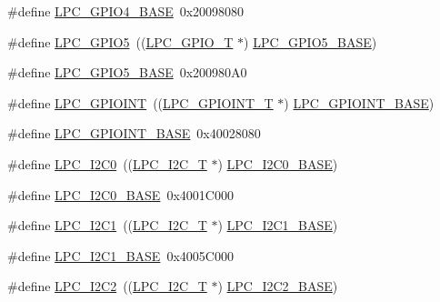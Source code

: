 \begin{DoxyCompactItemize}
\#define \hyperlink{group__PERIPH__177X__8X__BASE_gaa54352e7745932e78b56bcbc1d70fa21}{L\+P\+C\+\_\+\+G\+P\+I\+O4\+\_\+\+B\+A\+SE}~0x20098080
\item 
\#define \hyperlink{group__PERIPH__177X__8X__BASE_gad41551ad62a13c91b7fff17e4340cb69}{L\+P\+C\+\_\+\+G\+P\+I\+O5}~((\hyperlink{structLPC__GPIO__T}{L\+P\+C\+\_\+\+G\+P\+I\+O\+\_\+T}             $\ast$) \hyperlink{group__PERIPH__407X__8X__BASE_gaf6bbc732156be98ff8a4d15fa7558ad6}{L\+P\+C\+\_\+\+G\+P\+I\+O5\+\_\+\+B\+A\+SE})
\item 
\#define \hyperlink{group__PERIPH__177X__8X__BASE_gaf6bbc732156be98ff8a4d15fa7558ad6}{L\+P\+C\+\_\+\+G\+P\+I\+O5\+\_\+\+B\+A\+SE}~0x200980\+A0
\item 
\#define \hyperlink{group__PERIPH__177X__8X__BASE_gaefe2f52407c1ce58395766dc760525b5}{L\+P\+C\+\_\+\+G\+P\+I\+O\+I\+NT}~((\hyperlink{structLPC__GPIOINT__T}{L\+P\+C\+\_\+\+G\+P\+I\+O\+I\+N\+T\+\_\+T}          $\ast$) \hyperlink{group__PERIPH__407X__8X__BASE_gadf88491f4b83b5af99eaf30778cb62fa}{L\+P\+C\+\_\+\+G\+P\+I\+O\+I\+N\+T\+\_\+\+B\+A\+SE})
\item 
\#define \hyperlink{group__PERIPH__177X__8X__BASE_gadf88491f4b83b5af99eaf30778cb62fa}{L\+P\+C\+\_\+\+G\+P\+I\+O\+I\+N\+T\+\_\+\+B\+A\+SE}~0x40028080
\item 
\#define \hyperlink{group__PERIPH__177X__8X__BASE_ga14b6c56857e970a682a9bb22a0cb6716}{L\+P\+C\+\_\+\+I2\+C0}~((\hyperlink{structLPC__I2C__T}{L\+P\+C\+\_\+\+I2\+C\+\_\+T}              $\ast$) \hyperlink{group__PERIPH__407X__8X__BASE_gab4476c9e874621194369f74fcf26ce92}{L\+P\+C\+\_\+\+I2\+C0\+\_\+\+B\+A\+SE})
\item 
\#define \hyperlink{group__PERIPH__177X__8X__BASE_gab4476c9e874621194369f74fcf26ce92}{L\+P\+C\+\_\+\+I2\+C0\+\_\+\+B\+A\+SE}~0x4001\+C000
\item 
\#define \hyperlink{group__PERIPH__177X__8X__BASE_gad6d6333e47875813be171cffef258837}{L\+P\+C\+\_\+\+I2\+C1}~((\hyperlink{structLPC__I2C__T}{L\+P\+C\+\_\+\+I2\+C\+\_\+T}              $\ast$) \hyperlink{group__PERIPH__407X__8X__BASE_gae59f73cf24ff126be3b9a8b921926676}{L\+P\+C\+\_\+\+I2\+C1\+\_\+\+B\+A\+SE})
\item 
\#define \hyperlink{group__PERIPH__177X__8X__BASE_gae59f73cf24ff126be3b9a8b921926676}{L\+P\+C\+\_\+\+I2\+C1\+\_\+\+B\+A\+SE}~0x4005\+C000
\item 
\#define \hyperlink{group__PERIPH__177X__8X__BASE_ga6bcdaa0ab66f4e3d213a488b34055557}{L\+P\+C\+\_\+\+I2\+C2}~((\hyperlink{structLPC__I2C__T}{L\+P\+C\+\_\+\+I2\+C\+\_\+T}              $\ast$) \hyperlink{group__PERIPH__407X__8X__BASE_ga00796bd1f1fa200bbffcd9e7e8679eaa}{L\+P\+C\+\_\+\+I2\+C2\+\_\+\+B\+A\+SE})

\end{DoxyCompactItemize}
